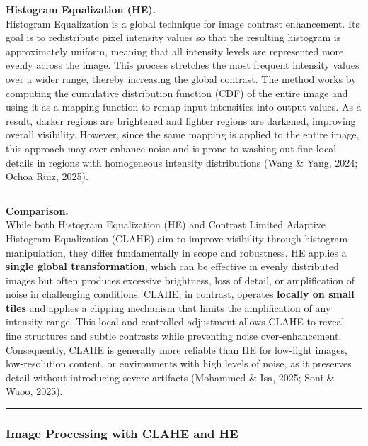 \documentclass[11pt]{article}
\begin{document}
    \textbf{Histogram Equalization (HE).}\\
Histogram Equalization is a global technique for image contrast
enhancement. Its goal is to redistribute pixel intensity values so that
the resulting histogram is approximately uniform, meaning that all
intensity levels are represented more evenly across the image. This
process stretches the most frequent intensity values over a wider range,
thereby increasing the global contrast. The method works by computing
the cumulative distribution function (CDF) of the entire image and using
it as a mapping function to remap input intensities into output values.
As a result, darker regions are brightened and lighter regions are
darkened, improving overall visibility. However, since the same mapping
is applied to the entire image, this approach may over-enhance noise and
is prone to washing out fine local details in regions with homogeneous
intensity distributions (Wang \& Yang, 2024; Ochoa Ruiz, 2025).

\begin{center}\rule{0.5\linewidth}{0.5pt}\end{center}

\textbf{Comparison.}\\
While both Histogram Equalization (HE) and Contrast Limited Adaptive
Histogram Equalization (CLAHE) aim to improve visibility through
histogram manipulation, they differ fundamentally in scope and
robustness. HE applies a \textbf{single global transformation}, which
can be effective in evenly distributed images but often produces
excessive brightness, loss of detail, or amplification of noise in
challenging conditions. CLAHE, in contrast, operates \textbf{locally on
small tiles} and applies a clipping mechanism that limits the
amplification of any intensity range. This local and controlled
adjustment allows CLAHE to reveal fine structures and subtle contrasts
while preventing noise over-enhancement. Consequently, CLAHE is
generally more reliable than HE for low-light images, low-resolution
content, or environments with high levels of noise, as it preserves
detail without introducing severe artifacts (Mohammed \& Isa, 2025; Soni
\& Waoo, 2025).

    \begin{center}\rule{0.5\linewidth}{0.5pt}\end{center}

\hypertarget{image-processing-with-clahe-and-he}{%
\subsubsection{Image Processing with CLAHE and
HE}\label{image-processing-with-clahe-and-he}}
\end{document}
